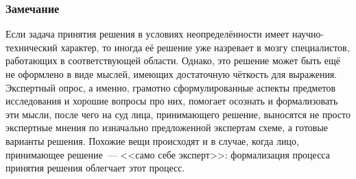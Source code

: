 \subsubsection*{Замечание}
\begin{notice}
Если задача принятия решения в условиях неопределённости имеет научно-технический характер, то иногда её решение уже назревает в мозгу специалистов, работающих в соответствующей области. Однако, это решение может быть ещё не оформлено в виде мыслей, имеющих достаточную чёткость для выражения. Экспертный опрос, а именно, грамотно сформулированные аспекты предметов исследования и хорошие вопросы про них, помогает осознать и формализовать эти мысли, после чего на суд лица, принимающего решение, выносятся не просто экспертные мнения по изначально предложенной экспертам схеме, а готовые варианты решения. Похожие вещи происходят и в случае, когда лицо, принимающее решение~--- <<само себе эксперт>>: формализация процесса принятия решения облегчает этот процесс. 
\end{notice}



